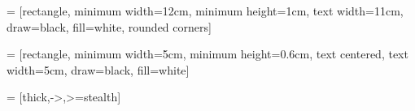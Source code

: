 \usepackage{tikz}
\usetikzlibrary{shapes.geometric, arrows, fit}

 = [rectangle, 
minimum width=12cm, 
minimum height=1cm, 
text width=11cm, 
draw=black, 
fill=white,
rounded corners]

 = [rectangle, 
minimum width=5cm, 
minimum height=0.6cm, 
text centered, 
text width=5cm, 
draw=black, 
fill=white]

 = [thick,->,>=stealth]